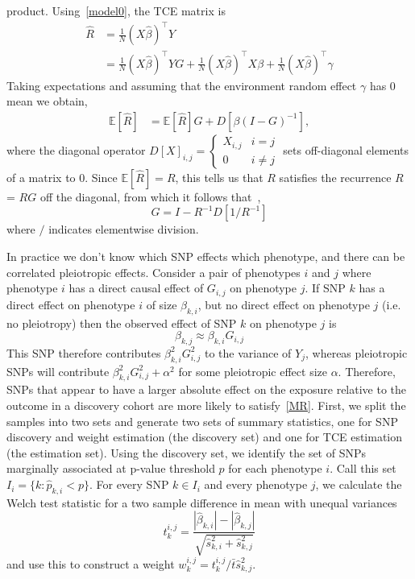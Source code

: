 \documentclass{article}
\begin{document}
product. Using~\eqref{model0}, the TCE matrix is
\begin{align*}
\hat{R} &= \frac{1}{N} (X\hat{\beta})^{\top} Y \\
  &= \frac{1}{N} (X\hat{\beta})^{\top} Y G + \frac{1}{N}(X\hat{\beta})^{\top} X \beta +
     \frac{1}{N}(X\hat{\beta})^{\top} \gamma
  \end{align*}
Taking expectations and assuming that the environment random effect $\gamma$ has 0 mean we obtain,
\begin{align*}
\mathbb{E}[\hat{R}]  &= \mathbb{E}[\hat{R}] G + D[\beta (I-G)^{-1}],
\end{align*}
where the diagonal operator $D[X]_{i,j} = \left\{ \begin{array}{ll}
  X_{i,j} & i=j \\ 0 & i \neq j \end{array} \right.$ sets off-diagonal elements
  of a matrix to 0.
  Since $\mathbb{E}[\hat{R}] = R$,
this tells us that $R$ satisfies the recurrence
  $R$ = $R G$ off the diagonal, from
  which it follows that~\cite{Pachter},
\begin{equation}\label{r_dce}
G = I - R^{-1} D[1 / R^{-1}]
\end{equation}
where $/$ indicates elementwise division.

In practice we don't know which SNP effects which phenotype,
and there can be correlated pleiotropic effects.
Consider a pair of phenotypes $i$ and $j$ where phenotype $i$ has a direct causal
effect of $G_{i, j}$ on phenotype $j$. If SNP $k$ has a direct effect on phenotype $i$
of size $\beta_{k, i}$, but no direct effect on phenotype $j$ (i.e. no pleiotropy)
then the observed effect of SNP $k$ on phenotype $j$ is
\begin{equation}\label{MR}
\beta_{k,j} \approx \beta_{k,i} G_{i,j}
\end{equation}
This SNP therefore contributes
$\beta_{k, i}^2 G_{i, j}^2$ to the variance of $Y_j$, whereas
pleiotropic SNPs will contribute $\beta_{k, i}^2 G_{i, j}^2 + \alpha^2$
for some pleiotropic effect size $\alpha$. Therefore, SNPs that appear to
have a larger absolute effect on the exposure relative to the outcome in a discovery 
cohort are more likely to satisfy~\eqref{MR}.
First, we split the samples into two sets and generate two sets of summary statistics,
one for SNP discovery and weight estimation (the discovery set) and one for TCE estimation
(the estimation set). Using the discovery set, we identify the set of SNPs marginally
associated at p-value threshold $p$ for each phenotype $i$.
Call this set $I_i = \{k: \hat{p}_{k, i} < p\}$. For every SNP $k \in I_i$ and
every phenotype $j$, we calculate the Welch test statistic for a two sample difference in mean with
unequal variances~\cite{Welch1947}
\begin{equation}
t^{i,j}_k = \frac{|\hat{\beta}_{k, i}| - |\hat{\beta}_{k, j}|}
  {\sqrt{\hat{s}^2_{k, i} + \hat{s}^2_{k, j}}}
\end{equation}
and use this to construct a weight $w^{i, j}_k = t^{i,j}_k/\bar{t} \hat{s}_{k, j}^2$.
  
\end{document}
